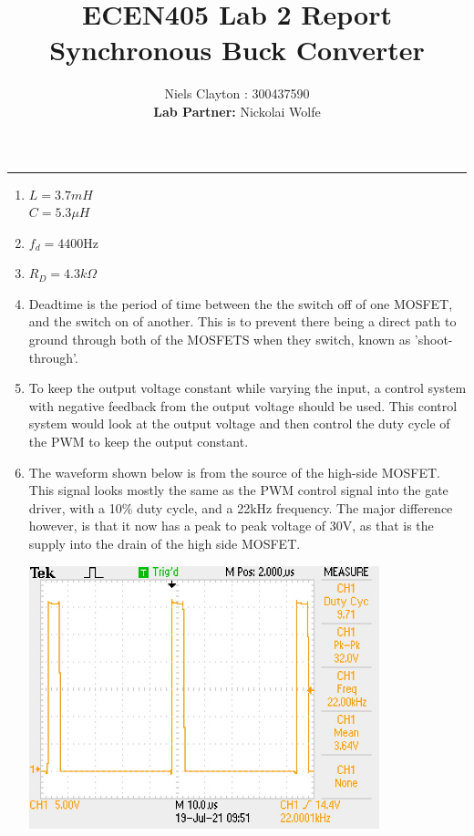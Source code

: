 \documentclass[a4paper,11pt]{article}
\begin{document}
\begin{preview}
\title{\LARGE{\textbf{ECEN405 Lab 2 Report\\Synchronous Buck Converter}}}
\author{Niels Clayton : 300437590\\\textbf{Lab Partner:} Nickolai Wolfe}
\date{}
\maketitle
\hrule

\begin{enumerate}

    \item $ L = 3.7mH $\\
    $ C = 5.3 \mu H $\\

    \item $f_d = 4400$Hz\\

    \item $R_D = 4.3k\Omega$\\
    
    \item Deadtime is the period of time between the the switch off of one MOSFET, and the switch on of another. This is to prevent there being a direct path to ground through both of the MOSFETS when they switch, known as 'shoot-through'.\\
    
    \item To keep the output voltage constant while varying the input, a control system with negative feedback from the output voltage should be used. This control system would look at the output voltage and then control the duty cycle of the PWM to keep the output constant.\\

    \item The waveform shown below is from the source of the high-side MOSFET. This signal looks mostly the same as the PWM control signal into the gate driver, with a 10\% duty cycle, and a 22kHz frequency. The major difference however, is that it now has a peak to peak voltage of 30V, as that is the supply into the drain of the high side MOSFET. 

    \begin{center}
      \includegraphics[width=0.8\textwidth]{high_side_drain_voltage.jpg}  
    \end{center}


\end{enumerate}
\end{preview}
\end{document}
